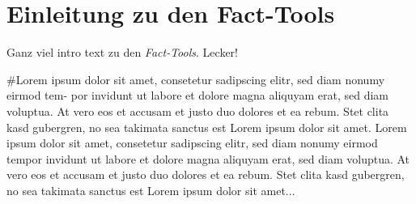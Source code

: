 \section{Einleitung zu den Fact-Tools}
Ganz viel intro text zu den \textit{Fact-Tools}. Lecker! 

#Lorem ipsum dolor sit amet, consetetur sadipscing elitr, sed diam nonumy eirmod tem-
por invidunt ut labore et dolore magna aliquyam erat, sed diam voluptua. At vero eos
et accusam et justo duo dolores et ea rebum. Stet clita kasd gubergren, no sea takimata
sanctus est Lorem ipsum dolor sit amet. Lorem ipsum dolor sit amet, consetetur sadipscing
elitr, sed diam nonumy eirmod tempor invidunt ut labore et dolore magna aliquyam erat,
sed diam voluptua. At vero eos et accusam et justo duo dolores et ea rebum. Stet clita kasd
gubergren, no sea takimata sanctus est Lorem ipsum dolor sit amet... 
